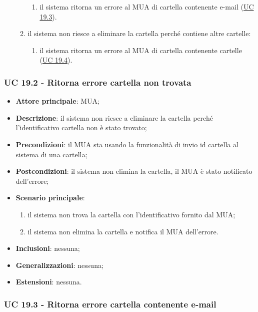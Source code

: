 \begin{itemize}
\begin{enumerate}[label=\alph*.]
\begin{enumerate}[label=\arabic*.]
                    \item il sistema ritorna un errore al MUA di cartella contenente e-mail (\hyperref[sec:UC19.3]{UC 19.3}).
                \end{enumerate}
                \item il sistema non riesce a eliminare la cartella perché contiene altre cartelle:
                \begin{enumerate}[label=\arabic*.]
                    \item il sistema ritorna un errore al MUA di cartella contenente cartelle (\hyperref[sec:UC19.4]{UC 19.4}).
                \end{enumerate}
            \end{enumerate}
    \end{itemize}


\subsubsection{UC 19.2 - Ritorna errore cartella non trovata} \label{sec:UC19.2}
    \begin{itemize}
        \item \textbf{Attore principale}: MUA;
        \item \textbf{Descrizione}: il sistema non riesce a eliminare la cartella perché l'identificativo cartella non è stato trovato;
        \item \textbf{Precondizioni}: il MUA sta usando la funzionalità di invio id cartella al sistema di una cartella;
        \item \textbf{Postcondizioni}: il sistema non elimina la cartella, il MUA è stato notificato dell'errore;
        \item \textbf{Scenario principale}:
            \begin{enumerate}
                \item il sistema non trova la cartella con l'identificativo fornito dal MUA;
                \item il sistema non elimina la cartella e notifica il MUA dell'errore.
            \end{enumerate}
        \item \textbf{Inclusioni}: nessuna;
        \item \textbf{Generalizzazioni}: nessuna;
        \item \textbf{Estensioni}: nessuna.
    \end{itemize}
   
    \subsubsection{UC 19.3 - Ritorna errore cartella contenente e-mail} \label{sec:UC19.3}


